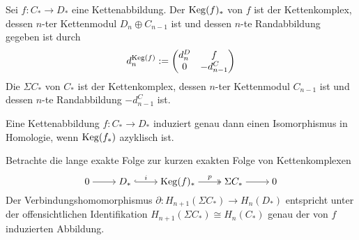 \begin{definition}[{name=[Kegel und Einhängung]}]
	Sei $f \colon C_* \to D_*$ eine Kettenabbildung. 
	Der  $\operatorname{Keg}(f)_*$ von $f$ ist der Kettenkomplex, dessen $n$-ter Kettenmodul $D_n \oplus C_{n-1}$ ist und dessen $n$-te Randabbildung gegeben ist durch
	\[
		d^{\operatorname{Keg}(f)}_n := \begin{pmatrix}
			d^D_n & f\\
			0 & -{d^C_{n-1}}
		\end{pmatrix}
	\]
	Die  $\Sigma C_*$ von $C_*$ ist der Kettenkomplex, dessen $n$-ter Kettenmodul $C_{n-1}$ ist und dessen $n$-te Randabbildung $-{d_{n-1}^C}$ ist.
\end{definition}

\begin{lemma}[{name=[{Isomorphismus induziert genau dann, wenn der Kegel azyklisch ist}]},label=lem:iso_homo_keg_azyklisch]
	Eine Kettenabbildung $f\colon C_* \to D_*$ induziert genau dann einen Isomorphismus in Homologie, wenn $\operatorname{Keg}(f_*)$ azyklisch ist.
\end{lemma}
\begin{beweis}
	Betrachte die lange exakte Folge zur kurzen exakten Folge von Kettenkomplexen
	\[
		\begin{tikzcd}[cramped]
			0 \rar & D_* \rar["i",hook] & \Keg(f)_* \rar["p",two heads] & \Sigma C_* \rar & 0
		\end{tikzcd}
	\]
	Der Verbindungshomomorphismus $\partial \colon H_{n+1}(\Sigma C_*) \to H_n(D_*)$ entspricht unter der offensichtlichen Identifikation $H_{n+1}(\Sigma C_*) \cong H_n(C_*)$ genau der von $f$ induzierten Abbildung.
\end{beweis}

